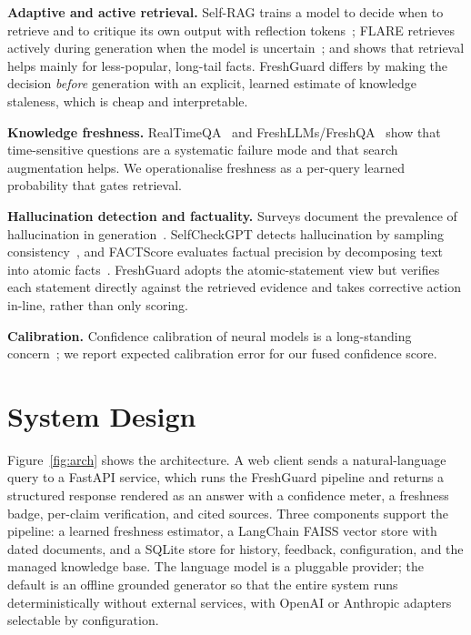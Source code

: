 \documentclass[conference]{IEEEtran}
\begin{document}
\textbf{Adaptive and active retrieval.} Self-RAG trains a model to decide when to
retrieve and to critique its own output with reflection tokens~\cite{asai2024selfrag};
FLARE retrieves actively during generation when the model is
uncertain~\cite{jiang2023flare}; and \cite{mallen2023popqa} shows that retrieval helps
mainly for less-popular, long-tail facts. FreshGuard differs by making the decision
\emph{before} generation with an explicit, learned estimate of knowledge staleness,
which is cheap and interpretable.

\textbf{Knowledge freshness.} RealTimeQA~\cite{kasai2023realtimeqa} and
FreshLLMs/FreshQA~\cite{vu2023freshllms} show that time-sensitive questions are a
systematic failure mode and that search augmentation helps. We operationalise freshness
as a per-query learned probability that gates retrieval.

\textbf{Hallucination detection and factuality.} Surveys document the prevalence of
hallucination in generation~\cite{ji2023survey}. SelfCheckGPT detects hallucination by
sampling consistency~\cite{manakul2023selfcheckgpt}, and FACTScore evaluates factual
precision by decomposing text into atomic facts~\cite{min2023factscore}. FreshGuard
adopts the atomic-statement view but verifies each statement directly against the
retrieved evidence and takes corrective action in-line, rather than only scoring.

\textbf{Calibration.} Confidence calibration of neural models is a long-standing
concern~\cite{guo2017calibration}; we report expected calibration error for our fused
confidence score.

\section{System Design}
Figure~\ref{fig:arch} shows the architecture. A web client sends a natural-language
query to a FastAPI service, which runs the FreshGuard pipeline and returns a structured
response rendered as an answer with a confidence meter, a freshness badge, per-claim
verification, and cited sources. Three components support the pipeline: a learned
freshness estimator, a LangChain FAISS vector store with dated documents, and a SQLite
store for history, feedback, configuration, and the managed knowledge base. The language
model is a pluggable provider; the default is an offline grounded generator so that the
entire system runs deterministically without external services, with OpenAI or
Anthropic adapters selectable by configuration.
\end{document}

